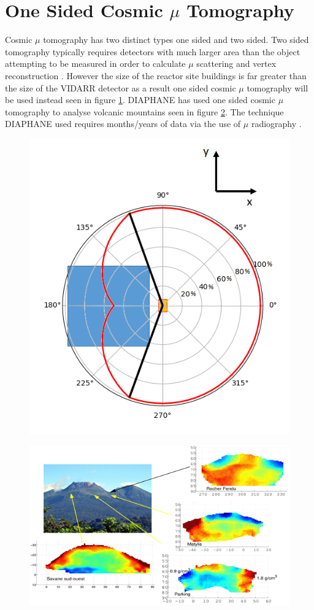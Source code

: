 \documentclass[12pt,a4paper]{article}
\begin{document}
\section{One Sided Cosmic $\mu$ Tomography}
Cosmic $\mu$ tomography has two distinct types one sided and two sided. Two sided tomography typically requires detectors with much larger area than the object attempting to be measured in order to calculate $\mu$ scattering and vertex reconstruction \cite{schultz_2007}. However the size of the reactor site buildings is far greater than the size of the VIDARR detector as a result one sided cosmic $\mu$ tomography will be used instead seen in figure \ref{fig:oneSidedMuTomography}. DIAPHANE has used one sided cosmic $\mu$ tomography to analyse volcanic mountains seen in figure \ref{fig:DIAPHANE_mountianImages}. The technique DIAPHANE used requires months/years of data via the use of $\mu$ radiography \cite{Marteau_2017}. 

\begin{figure}[H]
 \centering
 \includegraphics[width=0.5\linewidth]{oneSidedMuTomography.png}
 \label{fig:oneSidedMuTomography}
\end{figure}

\begin{figure}[H]
 \centering
 \includegraphics[width=1.0\linewidth]{DIAPHANE_mountainImages.png}
 \label{fig:DIAPHANE_mountianImages}
\end{figure}
\end{document}

